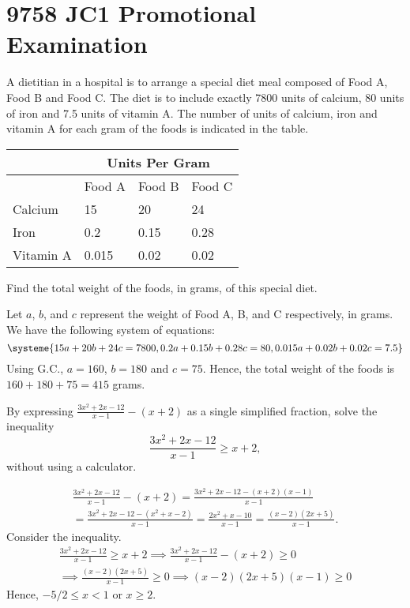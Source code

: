 \section{9758 JC1 Promotional Examination}

\begin{problem}
    A dietitian in a hospital is to arrange a special diet meal composed of Food A, Food B and Food C. The diet is to include exactly 7800 units of calcium, 80 units of iron and 7.5 units of vitamin A. The number of units of calcium, iron and vitamin A for each gram of the foods is indicated in the table.

    \begin{table}[H]
        \centering
        \begin{tabular}{|l|l|l|l|}
        \hline
        & \multicolumn{3}{|c|}{Units Per Gram} \\\hline
        & Food A & Food B & Food C \\\hline
        Calcium & 15 & 20 & 24 \\\hline
        Iron & 0.2 & 0.15 & 0.28 \\\hline
        Vitamin A & 0.015 & 0.02 & 0.02\\\hline
        \end{tabular}
    \end{table}

    Find the total weight of the foods, in grams, of this special diet.
\end{problem}
\begin{solution}
    Let $a$, $b$, and $c$ represent the weight of Food A, B, and C respectively, in grams. We have the following system of equations: \[\systeme{15a + 20b + 24c = 7800,0.2a+0.15b+0.28c=80,0.015a+0.02b+0.02c = 7.5}\] Using G.C., $a=160$, $b=180$ and $c=75$. Hence, the total weight of the foods is $160 + 180 + 75 = 415$ grams.
\end{solution}

\begin{problem}
    By expressing $\frac{3x^2 + 2x - 12}{x-1} - (x+2)$ as a single simplified fraction, solve the inequality \[\frac{3x^2 + 2x - 12}{x-1} \geq x + 2,\] without using a calculator.
\end{problem}
\begin{solution}
    \begin{gather*}
        \frac{3x^2+2x-12}{x-1} - (x+2) = \frac{3x^2 + 2x - 12 - (x+2)(x-1)}{x-1}\\
        = \frac{3x^2 + 2x - 12 - (x^2 + x - 2)}{x-1} = \frac{2x^2 + x - 10}{x-1} = \frac{(x-2)(2x+5)}{x-1}.
    \end{gather*}
    Consider the inequality.
    \begin{gather*}
        \frac{3x^2 + 2x - 12}{x-1} \geq x + 2 \implies \frac{3x^2 + 2x - 12}{x-1} - (x+2) \geq 0\\
        \implies \frac{(x-2)(2x+5)}{x-1} \geq 0 \implies (x-2)(2x+5)(x-1) \geq 0
    \end{gather*}
    Hence, $-5/2 \leq x < 1$ or $x \geq 2$.
\end{solution}

